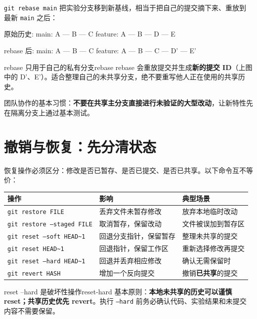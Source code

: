 \documentclass[12pt,a4paper]{ctexart}
\begin{document}
	\texttt{git rebase main} 把实验分支移到新基线，相当于把自己的提交摘下来、重放到最新 \texttt{main} 之后：

	\begin{codeblock}{}
原始历史:
main:    A --- B --- C
feature: A --- B --- D --- E

rebase 后:
main:    A --- B --- C
feature: A --- B --- C --- D' --- E'
	\end{codeblock}

	\begin{warning}{rebase 只用于自己的私有分支}{rebase}
		rebase 会重放提交并生成\textbf{新的提交 ID}（上图中的 D'、E'）。适合整理自己的未共享分支，绝不要重写他人正在使用的共享历史。
	\end{warning}

	团队协作的基本习惯：\textbf{不要在共享主分支直接进行未验证的大型改动}，让新特性先在隔离分支上通过基本测试。

	\section{撤销与恢复：先分清状态}

	恢复操作必须区分：修改是否已暂存、是否已提交、是否已共享。以下命令互不等价：

	\begin{tabularx}{\linewidth}{l l X}
		\toprule
		\textbf{操作} & \textbf{影响} & \textbf{典型场景} \\
		\midrule
		\texttt{git restore FILE} & 丢弃文件未暂存修改 & 放弃本地临时改动 \\
		\texttt{git restore --staged FILE} & 取消暂存，保留改动 & 文件被误加到暂存区 \\
		\texttt{git reset --soft HEAD\textasciitilde1} & 回退分支指针，保留暂存 & 整理未共享的提交 \\
		\texttt{git reset HEAD\textasciitilde1} & 回退指针，保留工作区 & 重新选择修改再提交 \\
		\texttt{git reset --hard HEAD\textasciitilde1} & 回退并丢弃相应修改 & 确认无需保留时 \\
		\texttt{git revert HASH} & 增加一个反向提交 & 撤销\textbf{已共享}的提交 \\
		\bottomrule
	\end{tabularx}

	\begin{warning}{reset --hard 是破坏性操作}{reset-hard}
		基本原则：\textbf{本地未共享的历史可以谨慎 reset；共享历史优先 revert}。执行 \texttt{--hard} 前务必确认代码、实验结果和未提交内容不需要保留。
	\end{warning}
\end{document}
